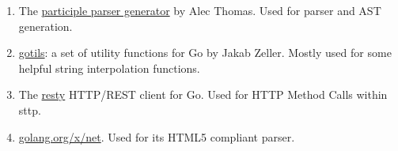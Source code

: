 \begin{enumerate}
    \item The \href{https://github.com/alecthomas/participle}{participle parser generator} by Alec Thomas. Used for parser and AST generation.
    \item \href{https://pkg.go.dev/github.com/andygello555/gotils}{gotils}: a set of utility functions for Go by Jakab Zeller. Mostly used for some helpful string interpolation functions.
    \item The \href{https://github.com/go-resty/resty}{resty} HTTP/REST client for Go. Used for HTTP Method Calls within sttp.
    \item \href{https://pkg.go.dev/golang.org/x/net}{golang.org/x/net}. Used for its HTML5 compliant parser.
\end{enumerate}


